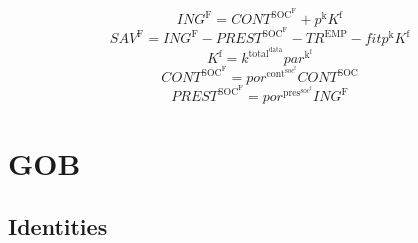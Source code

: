 \begin{equation}
{I\!N\!G}^{\mathrm{F}} = {C\!O\!N\!T}^{\mathrm{SOC}^{\mathrm{F}}} + {p^{\mathrm{k}}} {K^{\mathrm{f}}}
\end{equation}
\begin{equation}
{S\!A\!V}^{\mathrm{F}} = {I\!N\!G}^{\mathrm{F}} - {P\!R\!E\!S\!T}^{\mathrm{SOC}^{\mathrm{F}}} - {T\!R}^{\mathrm{EMP}} - {{f\!i\!t}} {p^{\mathrm{k}}} {K^{\mathrm{f}}}
\end{equation}
\begin{equation}
K^{\mathrm{f}} = {k^{\mathrm{total}^{\mathrm{data}}}} {{p\!a\!r}^{\mathrm{k}^{\mathrm{f}}}}
\end{equation}
\begin{equation}
{C\!O\!N\!T}^{\mathrm{SOC}^{\mathrm{F}}} = {{p\!o\!r}^{\mathrm{cont}^{\mathrm{soc}^{\mathrm{f}}}}} {{C\!O\!N\!T}^{\mathrm{SOC}}}
\end{equation}
\begin{equation}
{P\!R\!E\!S\!T}^{\mathrm{SOC}^{\mathrm{F}}} = {{p\!o\!r}^{\mathrm{pres}^{\mathrm{soc}^{\mathrm{f}}}}} {{I\!N\!G}^{\mathrm{F}}}
\end{equation}




\section{GOB}

\subsection{Identities}

